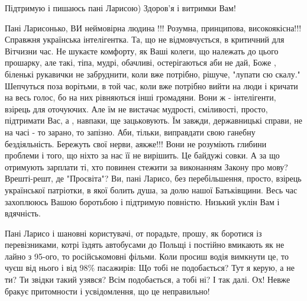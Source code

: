 \begin{itemize}
Підтримую і пишаюсь пані Ларисою) Здоров'я і витримки Вам!


 

Пані Ларисонько, ВИ неймовірна людина !!! Розумна, принципова, високоякісна!!!
Справжня українська інтелігентка. Та, що не відмовчується, в критичний для
Вітчизни час. Не шукаєте комфорту, як Ваші колеги, що належать до цього
прошарку, але такі, тіпа, мудрі, обачливі, остерігаються аби не дай, Боже ,
біленькі рукавички не забруднити, коли вже потрібно, рішуче, "лупати сю скалу."
Шепчуться поза ворітьми, в той час, коли вже потрібно вийти на люди і кричати
на весь голос, бо на них рівняються інші громадяни. Вони ж - інтелігенти,
взірець для оточуючих. Але їм не вистачає мудрості, сміливості, просто,
підтримати Вас, а , навпаки, ще зацьковують. Їм завжди, державницькі справи, не
на часі - то зарано, то запізно. Аби, тільки, виправдати свою ганебну
бездіяльність. Бережуть свої нерви, аякже!!! Вони не розуміють глибини проблеми
і того, що ніхто за нас її не вирішить. Це байдужі совки. А за що отримують
зарплати ті, хто повинен стежити за виконанням Закону про мову? Врешті-решт, де
"Просвіта"? Ви, пані Ларисо, без перебільшення, просто, взірець української
патріотки, в якої болить душа, за долю нашої Батьківщини. Весь час захоплююсь
Вашою боротьбою і підтримую повністю. Низький уклін Вам і вдячність.

 

Пані Ларисо і шановні користувачі, от порадьте, прошу, як боротися із
перевізниками, котрі їздять автобусами до Польщі і постійно вмикають як не
лайно з 95-ого, то російськомовні фільми. Коли просиш водія вимкнути це, то
чуєш від нього і від 98\% пасажирів: Що тобі не подобається? Тут я керую, а не
ти? Ти звідки такий узявся? Всім подобається, а тобі ні? І так далі. Ох! Невже
бракує притомности і усвідомлення, що це неправильно!

\begin{itemize}
 

\end{itemize}
\end{itemize}
